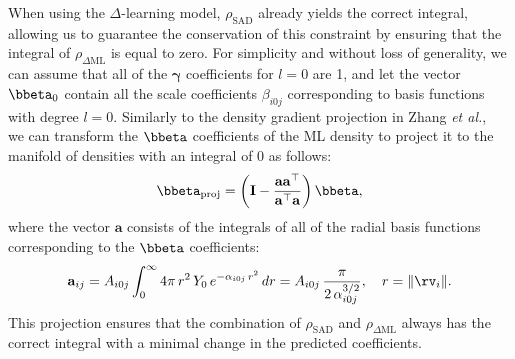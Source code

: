 \documentclass[12pt]{article}
\begin{document}
When using the $\Delta$-learning model, $\rho_{\mathrm{SAD}}$ already yields the correct integral, allowing us to guarantee the conservation of this constraint by ensuring that the integral of $\rho_{\Delta\mathrm{ML}}$ is equal to zero. For simplicity and without loss of generality, we can assume that all of the $\mathbf{\gamma}$ coefficients for $l=0$ are 1, and let the vector $\bbeta_0$ contain all the scale coefficients $\beta_{i0j}$ corresponding to basis functions with degree $l=0$. Similarly to the density gradient projection in Zhang \textit{et al.},~\cite{zhang2024overcoming} we can transform the $\bbeta$ coefficients of the ML density to project it to the manifold of densities with an integral of 0 as follows:
\begin{equation}\label{eq:integral_proj}
\bbeta_{\mathrm{proj}}=\left(\mathbf{I}-\frac{\mathbf{a} \mathbf{a}^{\top}}{\mathbf{a}^{\top} \mathbf{a}}\right) \bbeta,
\end{equation}
where the vector $\mathbf{a}$ consists of the integrals of all of the radial basis functions corresponding to the $\bbeta$ coefficients:
\begin{equation}\label{eq:norm_vector}
\mathbf{a}_{ij} = A_{i0j} \int_0^\infty 4\pi\, r^2\, Y_0\, e^{-\alpha_{i0j}\, r^2}\, dr = A_{i0j}\,\frac{\pi}{2\,\alpha_{i0j}^{3/2}}, \quad r=\lVert\rv_i\rVert.
\end{equation}
This projection ensures that the combination of $\rho_{\mathrm{SAD}}$ and $\rho_{\Delta\mathrm{ML}}$ always has the correct integral with a minimal change in the predicted coefficients.
\end{document}
